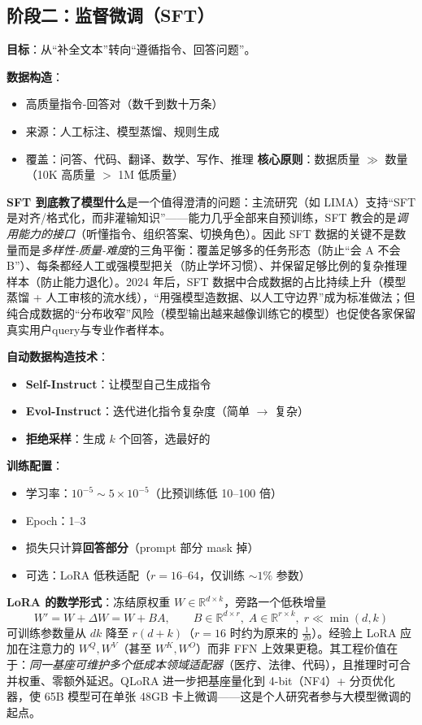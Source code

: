 \documentclass[12pt,a4paper]{article}
\begin{document}
\subsection{阶段二：监督微调（SFT）}

\textbf{目标}：从“补全文本”转向“遵循指令、回答问题”。

\textbf{数据构造}：
\begin{itemize}
  \item 高质量指令-回答对（数千到数十万条）
  \item 来源：人工标注、模型蒸馏、规则生成
  \item 覆盖：问答、代码、翻译、数学、写作、推理
\textbf{核心原则}：数据质量 $\gg$ 数量（10K 高质量 $>$ 1M 低质量）
\end{itemize}

\textbf{SFT 到底教了模型什么}是一个值得澄清的问题：主流研究（如 LIMA）支持“SFT 是对齐/格式化，而非灌输知识”——能力几乎全部来自预训练，SFT 教会的是\emph{调用能力的接口}（听懂指令、组织答案、切换角色）。因此 SFT 数据的关键不是数量而是\emph{多样性-质量-难度}的三角平衡：覆盖足够多的任务形态（防止“会 A 不会 B”）、每条都经人工或强模型把关（防止学坏习惯）、并保留足够比例的复杂推理样本（防止能力退化）。2024 年后，SFT 数据中合成数据的占比持续上升（模型蒸馏 + 人工审核的流水线），“用强模型造数据、以人工守边界”成为标准做法；但纯合成数据的“分布收窄”风险（模型输出越来越像训练它的模型）也促使各家保留真实用户query与专业作者样本。

\textbf{自动数据构造技术}：
\begin{itemize}
  \item \textbf{Self-Instruct}：让模型自己生成指令
  \item \textbf{Evol-Instruct}：迭代进化指令复杂度（简单 $\to$ 复杂）
  \item \textbf{拒绝采样}：生成 $k$ 个回答，选最好的
\end{itemize}

\textbf{训练配置}：
\begin{itemize}
  \item 学习率：$10^{-5} \sim 5 \times 10^{-5}$（比预训练低 10--100 倍）
  \item Epoch：1--3
  \item 损失只计算\textbf{回答部分}（prompt 部分 mask 掉）
  \item 可选：LoRA 低秩适配（$r=16\text{--}64$，仅训练 $\sim 1\%$ 参数）
\end{itemize}

\textbf{LoRA 的数学形式}：冻结原权重 $W\in\mathbb{R}^{d\times k}$，旁路一个低秩增量
\[
W' = W + \Delta W = W + B A, \qquad B\in\mathbb{R}^{d\times r},\; A\in\mathbb{R}^{r\times k},\; r \ll \min(d,k)
\]
可训练参数量从 $dk$ 降至 $r(d+k)$（$r=16$ 时约为原来的 $\frac{1}{20}$）。经验上 LoRA 应加在注意力的 $W^Q, W^V$（甚至 $W^K, W^O$）而非 FFN 上效果更稳。其工程价值在于：\emph{同一基座可维护多个低成本领域适配器}（医疗、法律、代码），且推理时可合并权重、零额外延迟。QLoRA 进一步把基座量化到 4-bit（NF4）+ 分页优化器，使 65B 模型可在单张 48GB 卡上微调——这是个人研究者参与大模型微调的起点。
\end{document}
